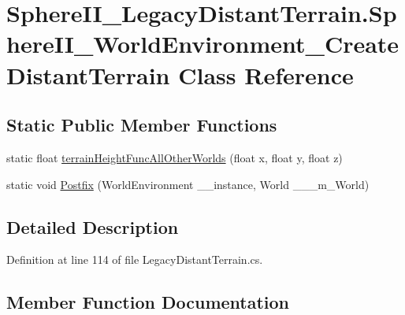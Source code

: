 \hypertarget{class_sphere_i_i___legacy_distant_terrain_1_1_sphere_i_i___world_environment___create_distant_terrain}{}\section{Sphere\+I\+I\+\_\+\+Legacy\+Distant\+Terrain.\+Sphere\+I\+I\+\_\+\+World\+Environment\+\_\+\+Create\+Distant\+Terrain Class Reference}
\label{class_sphere_i_i___legacy_distant_terrain_1_1_sphere_i_i___world_environment___create_distant_terrain}
\subsection*{Static Public Member Functions}
\begin{DoxyCompactItemize}
\item 
static float \mbox{\hyperlink{class_sphere_i_i___legacy_distant_terrain_1_1_sphere_i_i___world_environment___create_distant_terrain_a89e05a9a09ae1b05c416e7af9f8abd1d}{terrain\+Height\+Func\+All\+Other\+Worlds}} (float x, float y, float z)
\item 
static void \mbox{\hyperlink{class_sphere_i_i___legacy_distant_terrain_1_1_sphere_i_i___world_environment___create_distant_terrain_afa6f12b054e7ec0c5418bba753aa02f5}{Postfix}} (World\+Environment \+\_\+\+\_\+instance, World \+\_\+\+\_\+\+\_\+m\+\_\+\+World)
\end{DoxyCompactItemize}


\subsection{Detailed Description}


Definition at line 114 of file Legacy\+Distant\+Terrain.\+cs.



\subsection{Member Function Documentation}
\mbox{\label{class_sphere_i_i___legacy_distant_terrain_1_1_sphere_i_i___world_environment___create_distant_terrain_afa6f12b054e7ec0c5418bba753aa02f5}} 
